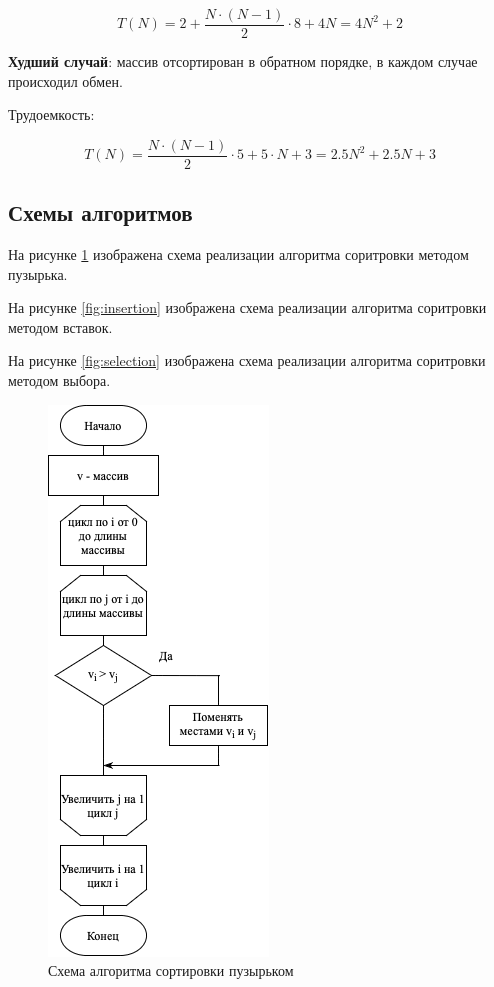 \documentclass[14pt,russian]{scrartcl}
\begin{document}
\begin{equation}
    T(N) = 2 + \frac{N \cdot (N - 1)}{2} \cdot 8 + 4N = 4N^2 + 2
\end{equation}

\textbf{Худший случай}: массив отсортирован в обратном порядке, в каждом случае происходил обмен.

Трудоемкость:

\begin{equation}
    T(N) = \frac{N \cdot (N - 1)}{2} \cdot 5 + 5 \cdot N + 3 = 2.5N^2 + 2.5N + 3
\end{equation}

\subsection{Схемы алгоритмов}

На рисунке \ref{fig:bubble} изображена схема реализации алгоритма соритровки методом пузырька.

На рисунке \ref{fig:insertion} изображена схема реализации алгоритма соритровки методом вставок.

На рисунке \ref{fig:selection} изображена схема реализации алгоритма соритровки методом выбора.

\begin{figure}[h]
	\centering
	\includegraphics[scale=1]{bubble.png}
	\caption{Схема алгоритма сортировки пузырьком}
	\label{fig:bubble}
\end{figure}
\end{document}
